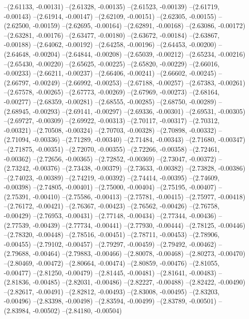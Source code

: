 --(2.61133, -0.00131)
--(2.61328, -0.00135)
--(2.61523, -0.00139)
--(2.61719, -0.00143)
--(2.61914, -0.00147)
--(2.62109, -0.00151)
--(2.62305, -0.00155)
--(2.62500, -0.00159)
--(2.62695, -0.00164)
--(2.62891, -0.00168)
--(2.63086, -0.00172)
--(2.63281, -0.00176)
--(2.63477, -0.00180)
--(2.63672, -0.00184)
--(2.63867, -0.00188)
--(2.64062, -0.00192)
--(2.64258, -0.00196)
--(2.64453, -0.00200)
--(2.64648, -0.00204)
--(2.64844, -0.00208)
--(2.65039, -0.00212)
--(2.65234, -0.00216)
--(2.65430, -0.00220)
--(2.65625, -0.00225)
--(2.65820, -0.00229)
--(2.66016, -0.00233)
--(2.66211, -0.00237)
--(2.66406, -0.00241)
--(2.66602, -0.00245)
--(2.66797, -0.00249)
--(2.66992, -0.00253)
--(2.67188, -0.00257)
--(2.67383, -0.00261)
--(2.67578, -0.00265)
--(2.67773, -0.00269)
--(2.67969, -0.00273)
--(2.68164, -0.00277)
--(2.68359, -0.00281)
--(2.68555, -0.00285)
--(2.68750, -0.00289)
--(2.68945, -0.00293)
--(2.69141, -0.00297)
--(2.69336, -0.00301)
--(2.69531, -0.00305)
--(2.69727, -0.00309)
--(2.69922, -0.00313)
--(2.70117, -0.00317)
--(2.70312, -0.00321)
--(2.70508, -0.00324)
--(2.70703, -0.00328)
--(2.70898, -0.00332)
--(2.71094, -0.00336)
--(2.71289, -0.00340)
--(2.71484, -0.00343)
--(2.71680, -0.00347)
--(2.71875, -0.00351)
--(2.72070, -0.00355)
--(2.72266, -0.00358)
--(2.72461, -0.00362)
--(2.72656, -0.00365)
--(2.72852, -0.00369)
--(2.73047, -0.00372)
--(2.73242, -0.00376)
--(2.73438, -0.00379)
--(2.73633, -0.00382)
--(2.73828, -0.00386)
--(2.74023, -0.00389)
--(2.74219, -0.00392)
--(2.74414, -0.00395)
--(2.74609, -0.00398)
--(2.74805, -0.00401)
--(2.75000, -0.00404)
--(2.75195, -0.00407)
--(2.75391, -0.00410)
--(2.75586, -0.00413)
--(2.75781, -0.00415)
--(2.75977, -0.00418)
--(2.76172, -0.00421)
--(2.76367, -0.00423)
--(2.76562, -0.00426)
--(2.76758, -0.00429)
--(2.76953, -0.00431)
--(2.77148, -0.00434)
--(2.77344, -0.00436)
--(2.77539, -0.00439)
--(2.77734, -0.00441)
--(2.77930, -0.00444)
--(2.78125, -0.00446)
--(2.78320, -0.00448)
--(2.78516, -0.00451)
--(2.78711, -0.00453)
--(2.78906, -0.00455)
--(2.79102, -0.00457)
--(2.79297, -0.00459)
--(2.79492, -0.00462)
--(2.79688, -0.00464)
--(2.79883, -0.00466)
--(2.80078, -0.00468)
--(2.80273, -0.00470)
--(2.80469, -0.00472)
--(2.80664, -0.00474)
--(2.80859, -0.00476)
--(2.81055, -0.00477)
--(2.81250, -0.00479)
--(2.81445, -0.00481)
--(2.81641, -0.00483)
--(2.81836, -0.00485)
--(2.82031, -0.00486)
--(2.82227, -0.00488)
--(2.82422, -0.00490)
--(2.82617, -0.00491)
--(2.82812, -0.00493)
--(2.83008, -0.00495)
--(2.83203, -0.00496)
--(2.83398, -0.00498)
--(2.83594, -0.00499)
--(2.83789, -0.00501)
--(2.83984, -0.00502)
--(2.84180, -0.00504)
